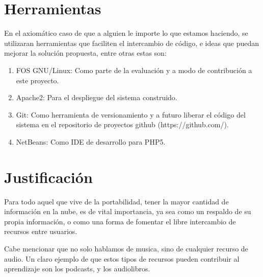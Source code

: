 \documentclass[letter,12pt]{article}
\begin{document}
\section{Herramientas}
En el axiomático caso de que a alguien le importe lo que estamos haciendo, se utilizaran herramientas
que faciliten el intercambio de código, e ideas que puedan mejorar la solución propuesta, entre otras
estas son:

\begin{enumerate}
\item FOS GNU/Linux: Como parte de la evaluación y a modo de contribución a este proyecto.
\item Apache2: Para el despliegue del sistema construido.
\item Git: Como herramienta de versionamiento y a futuro liberar el código del sistema en
el repositorio de proyectos github (https://github.com/).
\item NetBeans: Como IDE de desarrollo para PHP5.
\end{enumerate}

\section{Justificación}
Para todo aquel que vive de la portabilidad, tener la mayor cantidad de información en la nube, es
de vital importancia, ya sea como un respaldo de su propia información, o como una forma de fomentar el
libre intercambio de recursos entre usuarios.

Cabe mencionar que no solo hablamos de musica, sino de cualquier recurso de audio. Un claro ejemplo de
que estos tipos de recursos pueden contribuir al aprendizaje son los podcasts, y los audiolibros.
\end{document}
